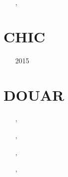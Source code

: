 \begin{small}
\begin{itemize}
\item[\twothousandeight] \textcite{yosh08}
\item[\twothousandnine] \textcite{yona09}
\item[\twothousandten]  \textcite{mohy10}
\item[\twothousandtwelve] \textcite{yoth12}, \textcite{yosh12}
\item[\twothousandthirteen] \textcite{yosh13}
\item[\twothousandtwenty] \textcite{yosy20}
\item[\twothousandtwentythree] \textcite{yosh23}
\end{itemize}
\end{small} 


\section{CHIC}  

\begin{small}
\begin{itemize}
\item[2015] \textcite{norv15}
\end{itemize}
\end{small}


\section{DOUAR}

\begin{small}
\begin{itemize}
\item[\twothousandeight]     \textcite{brtf08}, \textcite{thfb08}
\item[\twothousandnine]      \textcite{yahb09}
\item[\twothousandten]       \textcite{brya10}, \textcite{lobh10}
\item[\twothousandfourteen]  \textcite{mutg14}, \textcite{whbb14}
\item[\twothousandeighteen]  \textcite{neew18}
\item[\twothousandnineteen]  \textcite{koen19}
\item[\twothousandtwenty]    \textcite{scwh20}
\item[\twothousandtwentytwo] \textcite{kone22}, \textcite{konf22}
\end{itemize}
\end{small} 

